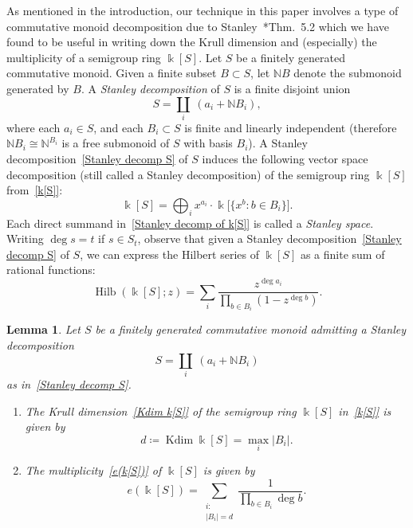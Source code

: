 \documentclass[noamsfonts,10pt]{amsart}
\newcommand{\N}{\mathbb{N}}
\renewcommand{\k}{\Bbbk}
\DeclareMathOperator{\Hilb}{Hilb}
\DeclareMathOperator{\Kdim}{Kdim}
\newcommand{\1}{\mathbf{1}}
\theoremstyle{plain}
\newtheorem{lemma}[theorem]{Lemma}
\theoremstyle{definition}
\numberwithin{equation}{section}
\begin{document}
As mentioned in the introduction, our technique in this paper involves a type of commutative monoid decomposition due to Stanley~\cite{Stanley82}*{Thm.~5.2} which we have found to be useful in writing down the Krull dimension and (especially) the multiplicity of a semigroup ring $\k[S]$.
Let $S$ be a finitely generated commutative monoid.
Given a finite subset $B \subset S$, let $\N B$ denote the submonoid generated by $B$.
A \emph{Stanley decomposition} of $S$ is a finite disjoint union
\begin{equation}
    \label{Stanley decomp S}
    S = \coprod_i \: (a_i + \N B_i),
\end{equation}
where each $a_i \in S$, and each $B_i \subset S$ is finite and linearly independent (therefore $\N B_i \cong \N^{B_i}$ is a free submonoid of $S$ with basis $B_i$).
A Stanley decomposition~\eqref{Stanley decomp S} of $S$ induces the following vector space decomposition (still called a Stanley decomposition) of the semigroup ring $\k[S]$ from~\eqref{k[S]}:
\begin{equation}
    \label{Stanley decomp of k[S]}
    \k[S] = \bigoplus_i x^{a_i} \cdot \k\big[ \{x^{b} : b \in B_i \} \big].
\end{equation}
Each direct summand in~\eqref{Stanley decomp of k[S]} is called a \emph{Stanley space}.
Writing $\deg s = t$ if $s \in S_t$, observe that given a Stanley decomposition~\eqref{Stanley decomp S} of $S$, we can express the Hilbert series of $\k[S]$ as a finite sum of rational functions:
\begin{equation}
    \label{Hilb k[S] with Stanley}
    \Hilb(\k[S];z) = \sum_i \frac{z^{\deg a_i}}{\prod_{b \in B_i} (1 - z^{\deg b})}.
\end{equation}

\begin{lemma}
    \label{lemma:Stanley decomp gives Kdim and e}
    Let $S$ be a finitely generated commutative monoid admitting a Stanley decomposition
        \[
            S = \coprod_{i} \: (a_i + \N B_i)
        \]
    as in~\eqref{Stanley decomp S}.
    \begin{enumerate}[label=\textup{(\arabic*)}]
    
        \item \label{Kdim = max} The Krull dimension~\eqref{Kdim k[S]} of the semigroup ring $\k[S]$ in~\eqref{k[S]} is given by
        \[
            d \coloneqq \Kdim \k[S] = \max_i \left| B_i \right|.
        \]
    
    \item \label{e = sum over max} The multiplicity~\eqref{e(k[S])} of $\k[S]$ is given by
        \[
            e(\k[S]) = \sum_{\substack{i: \\ \left| B_i \right| = d}} \frac{1}{\prod_{b \in B_i} \deg b}.
        \]

    \end{enumerate}
    
\end{lemma}
\end{document}
